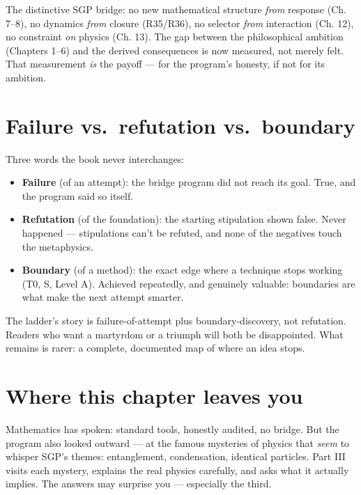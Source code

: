\documentclass[
  11pt,
]{book}
\providecommand{\tightlist}{%
  \setlength{\itemsep}{0pt}\setlength{\parskip}{0pt}}
\begin{document}
The distinctive SGP bridge: no new mathematical structure \emph{from}
response (Ch. 7--8), no dynamics \emph{from} closure (R35/R36), no
selector \emph{from} interaction (Ch. 12), no constraint \emph{on}
physics (Ch. 13). The gap between the philosophical ambition (Chapters
1--6) and the derived consequences is now measured, not merely felt.
That measurement \emph{is} the payoff --- for the program's honesty, if
not for its ambition.

\section{Failure vs.~refutation
vs.~boundary}\label{failure-vs.-refutation-vs.-boundary}

Three words the book never interchanges:

\begin{itemize}
\tightlist
\item
  \textbf{Failure} (of an attempt): the bridge program did not reach its
  goal. True, and the program said so itself.
\item
  \textbf{Refutation} (of the foundation): the starting stipulation
  shown false. Never happened --- stipulations can't be refuted, and
  none of the negatives touch the metaphysics.
\item
  \textbf{Boundary} (of a method): the exact edge where a technique
  stops working (T0, \textbar S, Level A). Achieved
  repeatedly, and genuinely valuable: boundaries are what make the next
  attempt smarter.
\end{itemize}

The ladder's story is failure-of-attempt plus boundary-discovery, not
refutation. Readers who want a martyrdom or a triumph will both be
disappointed. What remains is rarer: a complete, documented map of where
an idea stops.

\section{Where this chapter leaves
you}\label{where-this-chapter-leaves-you-12}

Mathematics has spoken: standard tools, honestly audited, no bridge. But
the program also looked outward --- at the famous mysteries of physics
that \emph{seem} to whisper SGP's themes: entanglement, condensation,
identical particles. Part III visits each mystery, explains the real
physics carefully, and asks what it actually implies. The answers may
surprise you --- especially the third.
\end{document}
